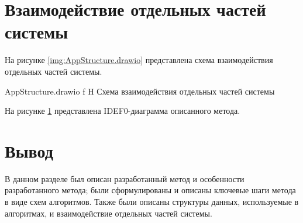 \section{Взаимодействие отдельных частей системы}

На рисунке \ref{img:AppStructure.drawio} представлена схема взаимодействия отдельных частей системы.

{AppStructure.drawio}
{f}
{H}
{\textwidth}
{Схема взаимодействия отдельных частей системы}

На рисунке \ref{} представлена IDEF0-диаграмма описанного метода.

\section*{Вывод}

В данном разделе был описан разработанный метод и особенности разработанного метода; были сформулированы и описаны ключевые шаги метода в виде схем алгоритмов. Также были описаны структуры данных, используемые в алгоритмах, и взаимодействие отдельных частей системы.